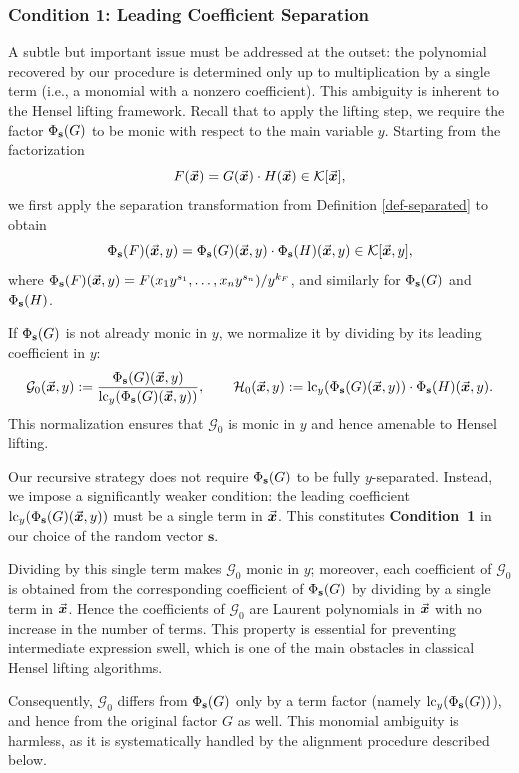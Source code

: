 \documentclass{article}
\numberwithin{equation}{section}
\begin{document}
\subsubsection*{Condition 1: Leading Coefficient Separation}

A subtle but important issue must be addressed at the outset: the polynomial recovered by our procedure is determined only up to multiplication by a single term (i.e., a monomial with a nonzero coefficient). This ambiguity is inherent to the Hensel lifting framework. Recall that to apply the lifting step, we require the factor $\Phi_{\mathbf{s}}(G)$ to be monic with respect to the main variable $y$. Starting from the factorization
\[
F(\vec{\boldsymbol{x}}) = G(\vec{\boldsymbol{x}}) \cdot H(\vec{\boldsymbol{x}}) \in {\mathcal{K}}[\vec{\boldsymbol{x}}],
\]
we first apply the separation transformation from Definition \ref{def-separated} to obtain
\[
\Phi_{\mathbf{s}}(F)(\vec{\boldsymbol{x}}, y) = \Phi_{\mathbf{s}}(G)(\vec{\boldsymbol{x}}, y) \cdot \Phi_{\mathbf{s}}(H)(\vec{\boldsymbol{x}}, y) \in {\mathcal{K}}[\vec{\boldsymbol{x}}, y],
\]
where $\Phi_{\mathbf{s}}(F)(\vec{\boldsymbol{x}}, y) = F(x_1 y^{s_1}, \dots, x_n y^{s_n}) / y^{k_F}$, and similarly for $\Phi_{\mathbf{s}}(G)$ and $\Phi_{\mathbf{s}}(H)$.

If $\Phi_{\mathbf{s}}(G)$ is not already monic in $y$, we normalize it by dividing by its leading coefficient in $y$:
\[
\mathcal{G}_0(\vec{\boldsymbol{x}}, y): = \frac{\Phi_{\mathbf{s}}(G)(\vec{\boldsymbol{x}}, y)}{\operatorname{lc}_y(\Phi_{\mathbf{s}}(G)(\vec{\boldsymbol{x}}, y))},
\qquad
\mathcal{H}_0(\vec{\boldsymbol{x}}, y):= \operatorname{lc}_y(\Phi_{\mathbf{s}}(G)(\vec{\boldsymbol{x}}, y)) \cdot \Phi_{\mathbf{s}}(H)(\vec{\boldsymbol{x}}, y).
\]
This normalization ensures that $\mathcal{G}_0$ is monic in $y$ and hence amenable to Hensel lifting.

Our recursive strategy does not require $\Phi_{\mathbf{s}}(G)$ to be fully $y$-separated. Instead, we impose a significantly weaker condition: the leading coefficient $\operatorname{lc}_y(\Phi_{\mathbf{s}}(G)(\vec{\boldsymbol{x}}, y))$ must be a single term in $\vec{\boldsymbol{x}}$. This constitutes \textbf{Condition~1} in our choice of the random vector $\mathbf{s}$.

Dividing by this single term makes $\mathcal{G}_0$ monic in $y$; moreover, each coefficient of $\mathcal{G}_0$ is obtained from the corresponding coefficient of $\Phi_{\mathbf{s}}(G)$ by dividing by a single term in $\vec{\boldsymbol{x}}$. Hence the coefficients of $\mathcal{G}_0$ are Laurent polynomials in $\vec{\boldsymbol{x}}$ with no increase in the number of terms. This property is essential for preventing intermediate expression swell, which is one of the main obstacles in classical Hensel lifting algorithms.

Consequently, $\mathcal{G}_0$ differs from $\Phi_{\mathbf{s}}(G)$ only by a term factor (namely $\operatorname{lc}_y(\Phi_{\mathbf{s}}(G))$), and hence from the original factor $G$ as well. This monomial ambiguity is harmless, as it is systematically handled by the alignment procedure described below.
\end{document}
